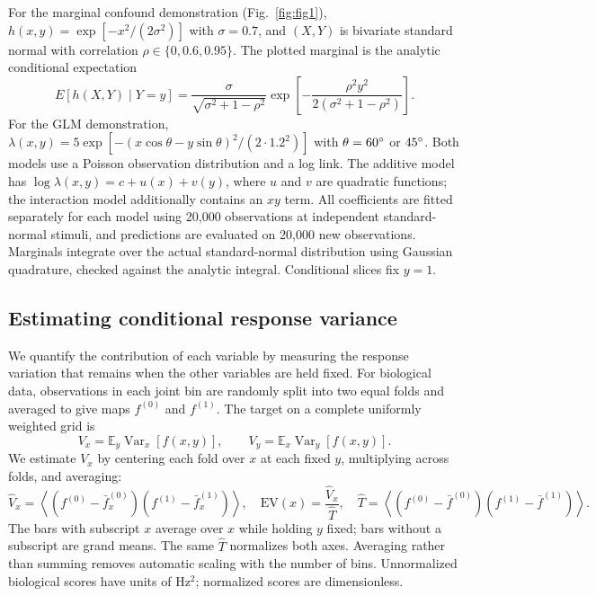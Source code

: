\documentclass[11pt]{article}
\begin{document}
For the marginal confound demonstration (Fig.~\ref{fig:fig1}), $h(x,y)=\exp[-x^2/(2\sigma^2)]$ with $\sigma=0.7$, and $(X,Y)$ is bivariate standard normal with correlation $\rho\in\{0,0.6,0.95\}$. The plotted marginal is the analytic conditional expectation
\[
E[h(X,Y)\mid Y=y]=\frac{\sigma}{\sqrt{\sigma^2+1-\rho^2}}\exp\left[-\frac{\rho^2y^2}{2(\sigma^2+1-\rho^2)}\right].
\]
For the GLM demonstration, $\lambda(x,y)=5\exp[-(x\cos\theta-y\sin\theta)^2/(2\cdot1.2^2)]$ with $\theta=60\degree$ or $45\degree$. Both models use a Poisson observation distribution and a log link. The additive model has $\log\lambda(x,y)=c+u(x)+v(y)$, where $u$ and $v$ are quadratic functions; the interaction model additionally contains an $xy$ term. All coefficients are fitted separately for each model using 20{,}000 observations at independent standard-normal stimuli, and predictions are evaluated on 20{,}000 new observations. Marginals integrate over the actual standard-normal distribution using Gaussian quadrature, checked against the analytic integral. Conditional slices fix $y=1$.

\subsection{Estimating conditional response variance}
We quantify the contribution of each variable by measuring the response variation that remains when the other variables are held fixed. For biological data, observations in each joint bin are randomly split into two equal folds and averaged to give maps $f^{(0)}$ and $f^{(1)}$. The target on a complete uniformly weighted grid is
\begin{equation}
V_x=\mathbb{E}_y\operatorname{Var}_x[f(x,y)],\qquad V_y=\mathbb{E}_x\operatorname{Var}_y[f(x,y)].
\label{eq:1}
\end{equation}
We estimate $V_x$ by centering each fold over $x$ at each fixed $y$, multiplying across folds, and averaging:
\begin{equation}
\widehat V_x=\left\langle(f^{(0)}-\bar f^{(0)}_x)(f^{(1)}-\bar f^{(1)}_x)\right\rangle,\quad
\mathrm{EV}(x)=\frac{\widehat V_x}{\widehat T},\quad
\widehat T=\left\langle(f^{(0)}-\bar f^{(0)})(f^{(1)}-\bar f^{(1)})\right\rangle.
\label{eq:2}
\end{equation}
The bars with subscript $x$ average over $x$ while holding $y$ fixed; bars without a subscript are grand means. The same $\widehat T$ normalizes both axes. Averaging rather than summing removes automatic scaling with the number of bins. Unnormalized biological scores have units of Hz$^2$; normalized scores are dimensionless.
\end{document}
